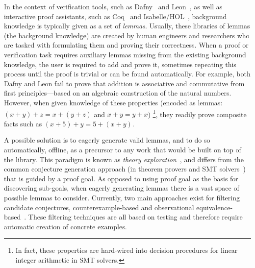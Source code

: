 In the context of verification tools, such as Dafny~\cite{LPAIR2010:Rustan} and Leon~\cite{SCALA13:Blanc}, as well as interactive proof assistants, such as 
Coq~\cite{Coq:manual} and Isabelle/HOL~\cite{Book2002:Nipkow},
background knowledge is typically given as a set of \emph{lemmas}.
Usually, these libraries of lemmas (\ie the background knowledge) are created by human engineers and researchers who are tasked with formulating them and proving their correctness.
When a proof or verification task requires auxiliary lemmas missing from the existing background knowledge, 
the user is required to add and prove it, sometimes repeating this process until the proof is trivial or can be found automatically.
For example, both Dafny and Leon fail to prove that addition is associative and commutative from first principles---based on an algebraic construction of the natural numbers.
However, when given knowledge of these properties (\ie encoded as lemmas: $(x + y) + z = x + (y + z)$ and $x + y = y + x$)%
\footnote{In fact, these properties are hard-wired into decision procedures for linear integer arithmetic in SMT solvers.}, they readily prove composite facts such as
$(x + 5) + y = 5 + (x + y)$.


\begin{comment}
Auxiliary propositions, such as the aforementioned properties of addition, are usually stored as part of one or more libraries
that are utilized by a reasoning tool such as a prover or a compiler.
Notable examples for this are the standard libraries of popular proof assistants
and the rewrite rules used by the Haskell compiler GHC for
performing optimizations such as Stream Fusion~\cite{SIGPLAN-Notices2007:Coutts}.
These libraries are written by expert developers over the course of years, and tend to grow quite large, making them hard to use and to maintain.
\end{comment}

A possible solution is to eagerly generate valid lemmas, and to do so automatically, offline,
as a precursor to any work that would be built on top of the library.
This paradigm is known as \emph{theory exploration}~\cite{Journal2002:Buchberger,JAL2006:Buchberger}, and differs from the common conjecture generation approach (in theorem provers and SMT solvers~\cite{cvc4induction}) that is guided by a proof goal.
As opposed to using proof goal as the basis for discovering sub-goals, when eagerly generating lemmas there is a vast space of possible lemmas to consider.
Currently, two main approaches exist for filtering candidate conjectures, counterexample-based and observational equivalence-based~\cite{JAR2010:Johanssonisacosy,2018AISC:Einarsdottir,hipster,hipstercond}.
These filtering techniques are all based on testing and therefore require automatic creation of concrete examples.

